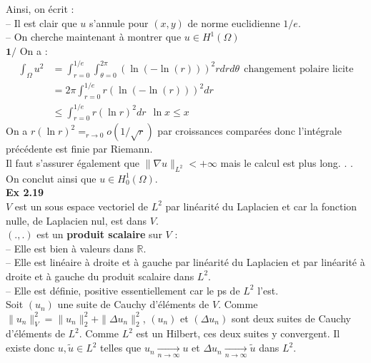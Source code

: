 \documentclass[a4paper,12pt]{article}
\newcommand{\Hun}{H^1(\Omega)}
\newcommand{\Ho}{H^1_0(\Omega)}
\begin{document}
Ainsi, on écrit : \\
-- Il est clair que $u$ s'annule pour $(x,y)$ de norme euclidienne $1/e$. \\

-- On cherche maintenant à montrer que $u \in \Hun$ \\

$\textbf{1/}$ On a :
\begin{align*}
\int_{\Omega} u^2 & = \int_{r=0}^{1/e} \int_{\theta = 0}^{2 \pi} (\ln (-\ln (r)))^2 r dr d \theta \ \ \text{changement polaire licite} \\
& = 2 \pi \int_{r=0}^{1/e} r (\ln (- \ln (r)))^2 dr \\
& \leq \int_{r=0}^{1/e} r (\ln r)^2 dr  \ \ \ln x \leq x
\end{align*}
On a $r (\ln r)^2 =_{r\rightarrow 0} o(1/\sqrt{r})$ par croissances comparées donc l'intégrale précédente est finie par Riemann. \\

Il faut s'assurer également que $\| \nabla u \|_{L^2} < + \infty$ mais le calcul est plus long. . . \\

On conclut ainsi que $u \in \Ho$. \\

\textbf{Ex 2.19} \\
$V$ est un sous espace vectoriel de $L^2$ par linéarité du Laplacien et car la fonction nulle, de Laplacien nul, est dans $V$. \\

$(.,.)$ est un \textbf{produit scalaire} sur $V$ : \\
-- Elle est bien à valeurs dans $\mathbb{R}$. \\
-- Elle est linéaire à droite et à gauche par linéarité du Laplacien et par linéarité à droite et à gauche du produit scalaire dans $L^2$. \\
-- Elle est définie, positive essentiellement car le ps de $L^2$ l'est. \\

Soit $(u_n)$ une suite de Cauchy d'éléments de $V$. Comme $\|u_n\|_V^2 = \|u_n\|_2^2 + \| \Delta u_n\|_2^2$, $(u_n)$ et $(\Delta u_n)$ sont deux suites de Cauchy d'éléments de $L^2$. Comme $L^2$ est un Hilbert, ces deux suites y convergent. Il existe donc $u, \tilde{u} \in L^2$ telles que $u_n \underset{n \to \infty}{\longrightarrow} u$ et $\Delta u_n \underset{n \to \infty}{\longrightarrow} \tilde{u}$ dans $L^2$. \\
\end{document}

